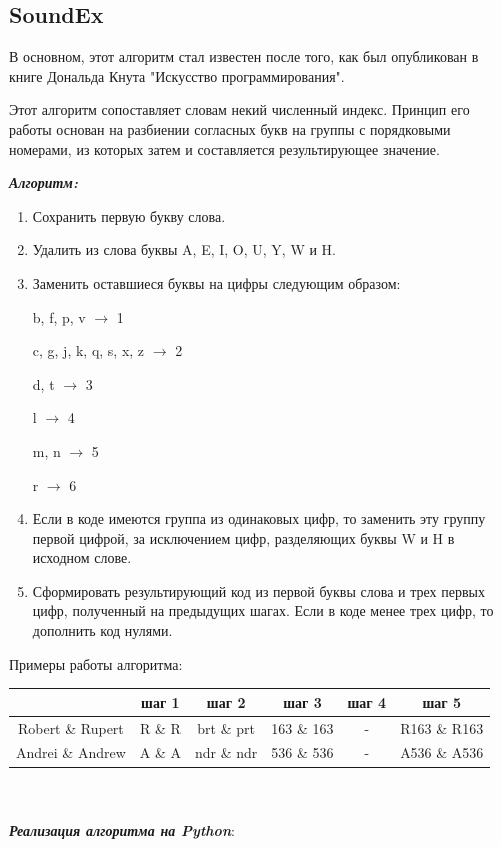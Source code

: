 \documentclass[titlepage,12pt]{article}
\begin{document}
\subsection{SoundEx} 

В основном, этот алгоритм стал известен после того, как был опубликован в книге Дональда Кнута "Искусство программирования".

Этот алгоритм сопоставляет словам некий численный индекс. Принцип его работы основан на разбиении согласных букв на группы с порядковыми номерами, из которых затем и составляется результирующее значение.

\textit{\textbf{Алгоритм:}}
\begin{enumerate}
    \item Сохранить первую букву слова.
    \item Удалить из слова буквы A, E, I, O, U, Y, W и H. 
    \item Заменить оставшиеся буквы на цифры следующим образом:

    b, f, p, v $\rightarrow$ 1
    
    c, g, j, k, q, s, x, z $\rightarrow$ 2
    
    d, t $\rightarrow$ 3
    
    l $\rightarrow$ 4
    
    m, n $\rightarrow$ 5
    
    r $\rightarrow$ 6
    
    \item Если в коде имеются группа из одинаковых цифр, то заменить эту группу первой цифрой, за исключением цифр, разделяющих буквы W и H в исходном слове.
    
    \item Сформировать результирующий код из первой буквы слова и трех первых цифр, полученный на предыдущих шагах. Если в коде менее трех цифр, то дополнить код нулями. 
\end{enumerate}

Примеры работы алгоритма:

\begin{tabular}{|c|c|c|c|c|c|}
    \hline
    & шаг 1 & шаг 2 & шаг 3 & шаг 4 & шаг 5\\
    \hline
    Robert \& Rupert & R \& R & brt \& prt & 163 \& 163 & - & R163 \& R163\\
    \hline
    Andrei \& Andrew & A \& A &  ndr \& ndr & 536 \& 536 & - & A536 \& A536\\
    \hline
\end{tabular}
\\
\\
\textit{\textbf{Реализация алгоритма на Python}}:
\end{document}
